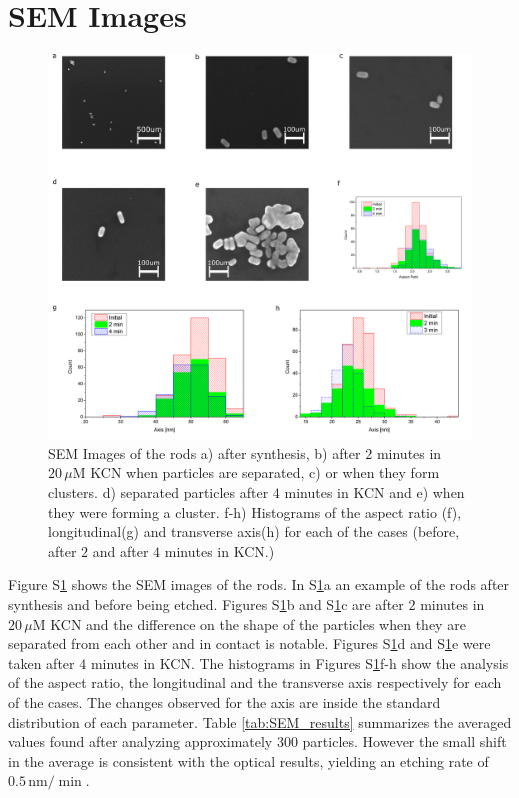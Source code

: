 \documentclass[a4paper,oneside,onecolumn]{article}
\newcommand{\uM}{\ensuremath{\,\mu\textrm{M}}}
\begin{document}
\section{SEM Images}

\begin{figure}[htp]
 \centering
 \includegraphics[width=0.95\linewidth]{Figures/04_Supporting/02_SEM/sem.png}
 \caption{SEM Images of the rods a) after synthesis, b) after $2$ minutes in
 $20\uM$ KCN when particles are separated, c) or when they form clusters. d)
 separated particles after $4$ minutes in KCN and e) when they were forming a
 cluster. f-h) Histograms of the aspect ratio (f), longitudinal(g) and
 transverse axis(h) for each of the cases (before, after $2$ and after $4$
 minutes in KCN.) }
 \label{fig:SEM}
\end{figure}

Figure S\ref{fig:SEM} shows the SEM images of the rods. In S\ref{fig:SEM}a an
example of the rods after synthesis and before being etched.
Figures S\ref{fig:SEM}b and S\ref{fig:SEM}c are after $2$ minutes in $20\uM$ KCN
and the difference on the shape of the particles when they are separated from each other and in contact is
notable. Figures S\ref{fig:SEM}d and S\ref{fig:SEM}e were taken after $4$
minutes in KCN.
The histograms in Figures S\ref{fig:SEM}f-h show the analysis of the aspect
ratio, the longitudinal and the transverse axis respectively for each of the  cases. The
changes observed for the axis are inside the standard distribution of each
parameter. Table \ref{tab:SEM_results} summarizes the averaged values found
after analyzing approximately $300$ particles. However the small shift in the
average is consistent with the optical results, yielding an etching rate of
$0.5\,\textrm{nm}/\min$.
\end{document}
